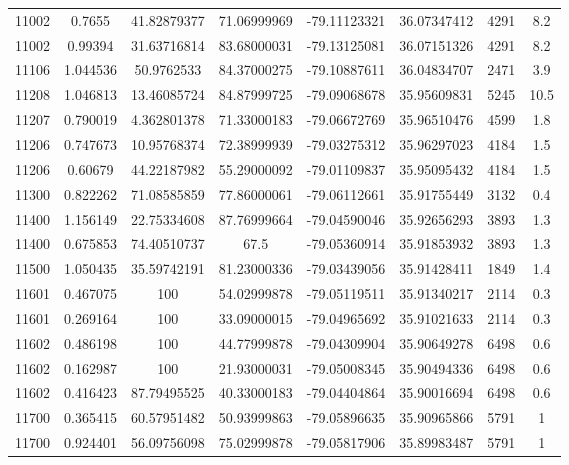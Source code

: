 \documentclass[11pt]{article}
\begin{document}
\begin{longtable*}{|c|c|c|c|c|c|c|c|}
11002 & 0.7655         & 41.82879377       & 71.06999969    & -79.11123321 & 36.07347412 & 4291       & 8.2  \\
11002 & 0.99394        & 31.63716814       & 83.68000031    & -79.13125081 & 36.07151326 & 4291       & 8.2  \\
11106 & 1.044536       & 50.9762533        & 84.37000275    & -79.10887611 & 36.04834707 & 2471       & 3.9  \\
11208 & 1.046813       & 13.46085724       & 84.87999725    & -79.09068678 & 35.95609831 & 5245       & 10.5 \\
11207 & 0.790019       & 4.362801378       & 71.33000183    & -79.06672769 & 35.96510476 & 4599       & 1.8  \\
11206 & 0.747673       & 10.95768374       & 72.38999939    & -79.03275312 & 35.96297023 & 4184       & 1.5  \\
11206 & 0.60679        & 44.22187982       & 55.29000092    & -79.01109837 & 35.95095432 & 4184       & 1.5  \\
11300 & 0.822262       & 71.08585859       & 77.86000061    & -79.06112661 & 35.91755449 & 3132       & 0.4  \\
11400 & 1.156149       & 22.75334608       & 87.76999664    & -79.04590046 & 35.92656293 & 3893       & 1.3  \\
11400 & 0.675853       & 74.40510737       & 67.5           & -79.05360914 & 35.91853932 & 3893       & 1.3  \\
11500 & 1.050435       & 35.59742191       & 81.23000336    & -79.03439056 & 35.91428411 & 1849       & 1.4  \\
11601 & 0.467075       & 100               & 54.02999878    & -79.05119511 & 35.91340217 & 2114       & 0.3  \\
11601 & 0.269164       & 100               & 33.09000015    & -79.04965692 & 35.91021633 & 2114       & 0.3  \\
11602 & 0.486198       & 100               & 44.77999878    & -79.04309904 & 35.90649278 & 6498       & 0.6  \\
11602 & 0.162987       & 100               & 21.93000031    & -79.05008345 & 35.90494336 & 6498       & 0.6  \\
11602 & 0.416423       & 87.79495525       & 40.33000183    & -79.04404864 & 35.90016694 & 6498       & 0.6  \\
11700 & 0.365415       & 60.57951482       & 50.93999863    & -79.05896635 & 35.90965866 & 5791       & 1    \\
11700 & 0.924401       & 56.09756098       & 75.02999878    & -79.05817906 & 35.89983487 & 5791       & 1    \\

\end{longtable*}
\end{document}
